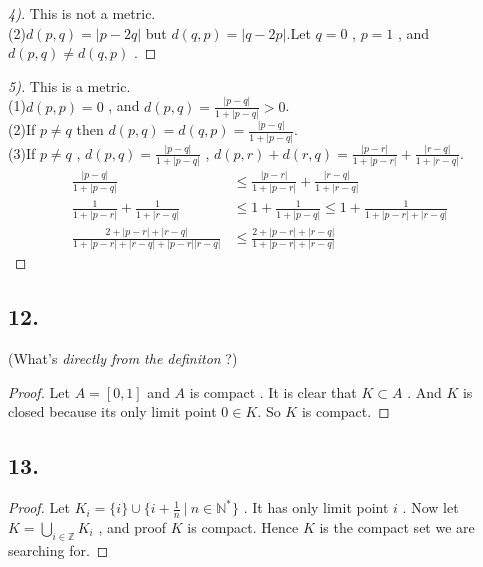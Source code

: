 \documentclass{report}
\begin{document}
                \begin{proof}[4)]
                    This is not a metric.\\
                    (2)$d(p,q)=|p-2q|$ but $d(q,p)=|q-2p|$.Let $q=0$ , $p=1$ , and $d(p,q) \not = d(q,p)$ .
                \end{proof}
                \begin{proof}[5)]
                    This is a metric.\\
                    (1)$d(p,p)=0$ , and $d(p,q)=\frac{|p-q|}{1+|p-q|}>0$.\\
                    (2)If $p \not = q$ then $d(p,q)=d(q,p)=\frac{|p-q|}{1+|p-q|}$.\\
                    (3)If $p \not = q$ , $d(p,q)=\frac{|p-q|}{1+|p-q|}$ , $d(p,r)+d(r,q) =\frac{|p-r|}{1+|p-r|}+\frac{|r-q|}{1+|r-q|}$.\\
                    \begin{align*}
                        \frac{|p-q|}{1+|p-q|} &\le \frac{|p-r|}{1+|p-r|}+\frac{|r-q|}{1+|r-q|}\\
                        \frac{1}{1+|p-r|}+\frac{1}{1+|r-q|} &\le 1+\frac{1}{1+|p-q|} \le 1+\frac{1}{1+|p-r|+|r-q|}\\
                        \frac{2+|p-r|+|r-q|}{1+|p-r|+|r-q|+|p-r||r-q|} &\le \frac{2+|p-r|+|r-q|}{1+|p-r|+|r-q|}
                    \end{align*}
                \end{proof}
            \subsection*{12.}
                (What's \textit{directly from the definiton} ?)
                \begin{proof}
                    Let $A= [0,1]$ and $A$ is compact . It is clear that $K \subset A$ .
                    And $K$ is closed because its only limit point $0 \in K$.
                    So $K$ is compact.
                \end{proof}
            \subsection*{13.}
                \begin{proof}
                    Let $K_i=\{i\}\cup\{i+\frac{1}{n} \ | \ n \in \mathbb{N^*}\}$ . It has only limit point $i$ .
                    Now let $K=\bigcup_{i \in \mathbb{Z}} K_i$ , and proof $K$ is compact.
                    Hence $K$ is the compact set we are searching for.
                \end{proof}
\end{document}

